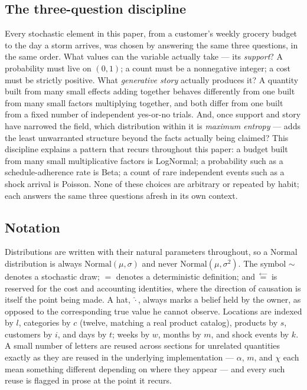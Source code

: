 \documentclass[12pt,a4paper]{article}
\begin{document}
\subsection{The three-question discipline}

Every stochastic element in this paper, from a customer's weekly grocery
budget to the day a storm arrives, was chosen by answering the same
three questions, in the same order. What values can the variable
actually take --- its \emph{support}? A probability must live on
$(0,1)$; a count must be a nonnegative integer; a cost must be strictly
positive. What \emph{generative story} actually produces it? A quantity
built from many small effects adding together behaves differently from
one built from many small factors multiplying together, and both differ
from one built from a fixed number of independent yes-or-no trials.
And, once support and story have narrowed the field, which distribution
within it is \emph{maximum entropy} --- adds the least unwarranted
structure beyond the facts actually being claimed? This discipline
explains a pattern that recurs throughout this paper: a budget built
from many small multiplicative factors is LogNormal; a probability such
as a schedule-adherence rate is Beta; a count of rare independent events
such as a shock arrival is Poisson. None of these choices are arbitrary
or repeated by habit; each answers the same three questions afresh in
its own context.

\subsection{Notation}

Distributions are written with their natural parameters throughout, so a
Normal distribution is always $\text{Normal}(\mu,\sigma)$ and never
$\text{Normal}(\mu,\sigma^2)$. The symbol $\sim$ denotes a stochastic
draw; $=$ denotes a deterministic definition; and
$\overset{\leftarrow}{=}$ is reserved for the cost and accounting
identities, where the direction of causation is itself the point being
made. A hat, $\hat{\cdot}$, always marks a belief held by the owner, as
opposed to the corresponding true value he cannot observe. Locations are
indexed by $l$, categories by $c$ (twelve, matching a real product
catalog), products by $s$, customers by $i$, and days by $t$; weeks by
$w$, months by $m$, and shock events by $k$. A small number of letters
are reused across sections for unrelated quantities exactly as they are
reused in the underlying implementation --- $\alpha$, $m$, and $\chi$
each mean something different depending on where they appear --- and
every such reuse is flagged in prose at the point it recurs.
\end{document}
